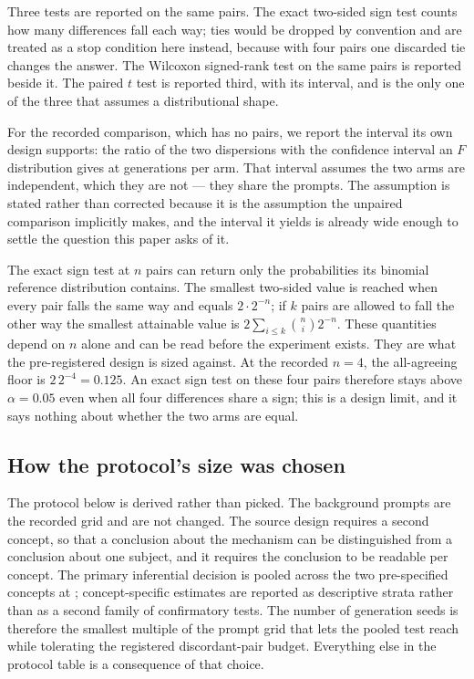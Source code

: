 Three tests are reported on the same \NPairs{} pairs. The exact two-sided sign
test counts how many differences fall each way; ties would be dropped by
convention and are treated as a stop condition here instead, because with four
pairs one discarded tie changes the answer. The Wilcoxon signed-rank test on the
same pairs is reported beside it. The paired $t$ test is reported third, with
its interval, and is the only one of the three that assumes a distributional
shape.

For the recorded comparison, which has no pairs, we report the interval its own
design supports: the ratio of the two dispersions with the confidence interval
an $F$ distribution gives at \NPairs{} generations per arm. That interval
assumes the two arms are independent, which they are not --- they share the
prompts. The assumption is stated rather than corrected because it is the
assumption the unpaired comparison implicitly makes, and the interval it yields
is already wide enough to settle the question this paper asks of it.

The exact sign test at $n$ pairs can return only the probabilities its
binomial reference distribution contains. The smallest two-sided value is
reached when every pair falls the same way and equals $2 \cdot 2^{-n}$; if $k$
pairs are allowed to fall the other way the smallest attainable value is
$2 \sum_{i \le k} \binom{n}{i} 2^{-n}$. These quantities depend on $n$ alone
and can be read before the experiment exists. They are what the pre-registered
design is sized against. At the recorded \(n=4\), the all-agreeing floor is
\(2\,2^{-4}=0.125\). An exact sign test on these four pairs therefore stays
above \(\alpha=0.05\) even when all four differences share a sign; this is a
design limit, and it says nothing about whether the two arms are equal.

\subsection{How the protocol's size was chosen}

The protocol below is derived rather than picked. The background prompts are
the recorded grid and are not changed. The source design requires a second
concept, so that a conclusion about the mechanism can be distinguished from a
conclusion about one subject, and it requires the conclusion to be readable per
concept. The primary inferential decision is pooled across the two pre-specified
concepts at \Alpha{}; concept-specific estimates are reported as descriptive
strata rather than as a second family of confirmatory tests. The number of
generation seeds is therefore the smallest multiple of the prompt grid that lets
the pooled test reach \Alpha{} while tolerating the registered discordant-pair
budget. Everything else in the protocol table is a consequence of that choice.

